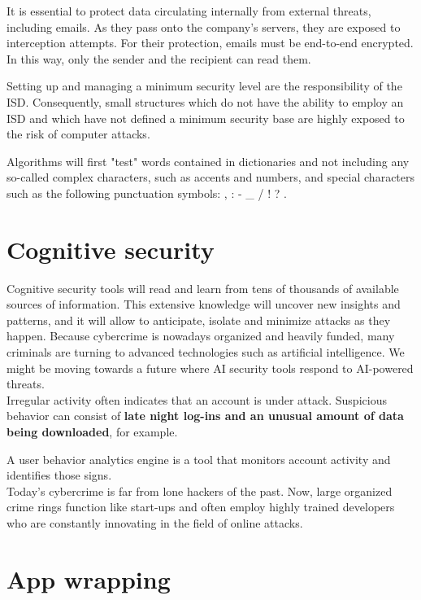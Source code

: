 \begin{itemize}
It is essential to protect data circulating internally from external threats, including emails. As they pass onto the company’s servers, they are exposed to interception attempts. For their protection, emails must be end-to-end encrypted. In this way, only the sender and the recipient can read them.

Setting up and managing a minimum security level are the responsibility of the ISD. Consequently, small structures which do not have the ability to employ an ISD and which have not defined a minimum security base are highly exposed to the risk of computer attacks.

Algorithms will first "test" words contained in dictionaries and not including any so-called complex characters, such as accents and numbers, and special characters such as the following punctuation symbols: , : - _ / ! ? .

\section{Cognitive security}

Cognitive security tools will read and learn from tens of thousands of available sources of information. This extensive knowledge will uncover new insights and patterns, and it will allow to anticipate, isolate and minimize attacks as they happen.
Because cybercrime is nowadays organized and heavily funded, many criminals are turning to advanced technologies such as artificial intelligence. We might be moving towards a future where AI security tools respond to AI-powered threats.
\\

Irregular activity often indicates that an account is under attack. 
Suspicious behavior can consist of \textbf{late night log-ins and an unusual amount of data being downloaded}, for example. 
  
A user behavior analytics engine is a tool that monitors account activity and identifies those signs.
\\

Today’s cybercrime is far from lone hackers of the past. Now, large organized crime rings function like start-ups and often employ highly trained developers who are constantly innovating in the field of online attacks.
\blindtext



\section{App wrapping}


\end{itemize}
